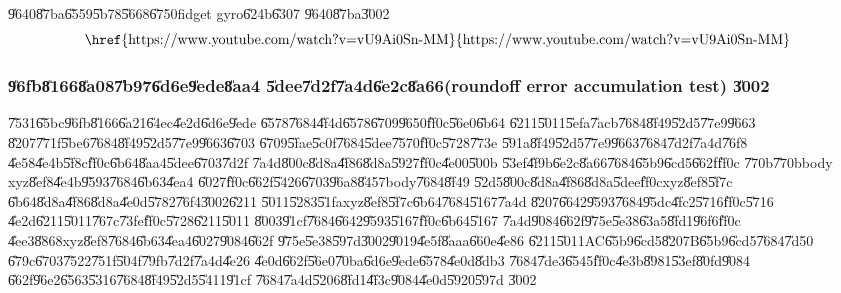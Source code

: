 \bigskip

\U{9640}\U{87ba}\U{6559}\U{5b78}\U{5668}\U{6750}fidget gyro\U{624b}\U{6307}%
\U{9640}\U{87ba}\U{3002}%
\begin{equation*}
\text{\href{https://www.youtube.com/watch?v=vU9Ai0Sn-MM}{%
https://www.youtube.com/watch?v=vU9Ai0Sn-MM}}
\end{equation*}

\clearpage%

\subsubsection{\U{96fb}\U{8166}\U{8a08}\U{7b97}\U{6d6e}\U{9ede}\U{8aa4}%
\U{5dee}\U{7d2f}\U{7a4d}\U{6e2c}\U{8a66}(roundoff error accumulation test)%
\U{3002}}

\U{7531}\U{65bc}\U{96fb}\U{8166}\U{6a21}\U{64ec}\U{4e2d}\U{6d6e}\U{9ede}%
\U{6578}\U{7684}\U{4f4d}\U{6578}\U{6709}\U{9650}\U{ff0c}\U{56e0}\U{6b64}%
\U{6211}\U{5011}\U{5efa}\U{7acb}\U{7684}\U{8f49}\U{52d5}\U{77e9}\U{9663}%
\U{8207}\U{771f}\U{5be6}\U{7684}\U{8f49}\U{52d5}\U{77e9}\U{9663}\U{6703}%
\U{6709}\U{5fae}\U{5c0f}\U{7684}\U{5dee}\U{7570}\U{ff0c}\U{5728}\U{773e}%
\U{591a}\U{8f49}\U{52d5}\U{77e9}\U{9663}\U{7684}\U{7d2f}\U{7a4d}\U{76f8}%
\U{4e58}\U{4e4b}\U{5f8c}\U{ff0c}\U{6b64}\U{8aa4}\U{5dee}\U{6703}\U{7d2f}%
\U{7a4d}\U{800c}\U{8d8a}\U{4f86}\U{8d8a}\U{5927}\U{ff0c}\U{4e00}\U{500b}%
\U{53ef}\U{4f9b}\U{6e2c}\U{8a66}\U{7684}\U{65b9}\U{6cd5}\U{662f}\U{ff0c}%
\U{770b}\U{770b}body xyz\U{8ef8}\U{4e4b}\U{9593}\U{7684}\U{6b63}\U{4ea4}%
\U{6027}\U{ff0c}\U{662f}\U{5426}\U{6703}\U{96a8}\U{8457}body\U{7684}\U{8f49}%
\U{52d5}\U{800c}\U{8d8a}\U{4f86}\U{8d8a}\U{5dee}\U{ff0c}xyz\U{8ef8}\U{5f7c}%
\U{6b64}\U{8d8a}\U{4f86}\U{8d8a}\U{4e0d}\U{5782}\U{76f4}\U{3002}\U{6211}%
\U{5011}\U{5283}\U{51fa}xyz\U{8ef8}\U{5f7c}\U{6b64}\U{7684}\U{5167}\U{7a4d}%
\U{8207}\U{6642}\U{9593}\U{7684}\U{95dc}\U{4fc2}\U{5716}\U{ff0c}\U{5716}%
\U{4e2d}\U{6211}\U{5011}\U{767c}\U{73fe}\U{ff0c}\U{5728}\U{6211}\U{5011}%
\U{8003}\U{91cf}\U{7684}\U{6642}\U{9593}\U{5167}\U{ff0c}\U{6b64}\U{5167}%
\U{7a4d}\U{9084}\U{662f}\U{975e}\U{5e38}\U{63a5}\U{8fd1}\U{96f6}\U{ff0c}%
\U{4ee3}\U{8868}xyz\U{8ef8}\U{7684}\U{6b63}\U{4ea4}\U{6027}\U{9084}\U{662f}%
\U{975e}\U{5e38}\U{597d}\U{3002}\U{9019}\U{4e5f}\U{8aaa}\U{660e}\U{4e86}%
\U{6211}\U{5011}AC\U{65b9}\U{6cd5}\U{8207}B\U{65b9}\U{6cd5}\U{7684}\U{7d50}%
\U{679c}\U{6703}\U{7522}\U{751f}\U{504f}\U{79fb}\U{7d2f}\U{7a4d}\U{4e26}%
\U{4e0d}\U{662f}\U{56e0}\U{70ba}\U{6d6e}\U{9ede}\U{6578}\U{4e0d}\U{8db3}%
\U{7684}\U{7de3}\U{6545}\U{ff0c}\U{4e3b}\U{8981}\U{53ef}\U{80fd}\U{9084}%
\U{662f}\U{96e2}\U{6563}\U{5316}\U{7684}\U{8f49}\U{52d5}\U{5411}\U{91cf}%
\U{7684}\U{7a4d}\U{5206}\U{8fd1}\U{4f3c}\U{9084}\U{4e0d}\U{5920}\U{597d}%
\U{3002}

